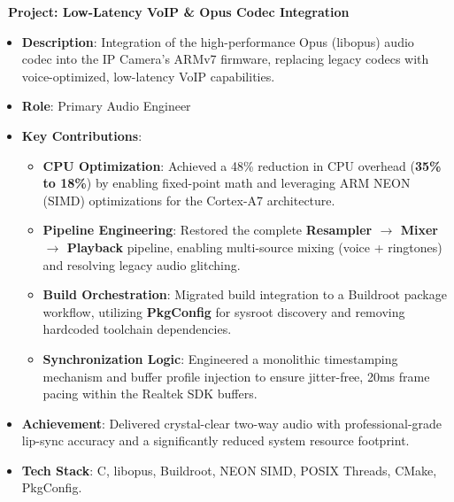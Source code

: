 \documentclass[letterpaper,10pt]{article}
\newenvironment{resume_list}{
  \vspace{-7pt}
  \begin{itemize}[itemsep=-2px, parsep=1pt, leftmargin=30pt]
}{
  \end{itemize}
}
\begin{document}
\begin{resume_list}
      \item \textbf{\faMicrophone\ Project: Low-Latency VoIP \& Opus Codec Integration}
        \begin{itemize}[itemsep=1pt, leftmargin=15pt, label=-]
          \item \textbf{Description}: Integration of the high-performance Opus (libopus) audio codec into the IP Camera’s ARMv7 firmware, replacing legacy codecs with voice-optimized, low-latency VoIP capabilities.
          \item \textbf{Role}: Primary Audio Engineer
          \item \textbf{Key Contributions}:
            \begin{itemize}[itemsep=0pt, leftmargin=10pt, label=$\circ$]
               \item \textbf{CPU Optimization}: Achieved a 48\% reduction in CPU overhead (\textbf{35\% to 18\%}) by enabling fixed-point math and leveraging ARM NEON (SIMD) optimizations for the Cortex-A7 architecture.
               \item \textbf{Pipeline Engineering}: Restored the complete \textbf{Resampler $\rightarrow$ Mixer $\rightarrow$ Playback} pipeline, enabling multi-source mixing (voice + ringtones) and resolving legacy audio glitching.
               \item \textbf{Build Orchestration}: Migrated build integration to a Buildroot package workflow, utilizing \textbf{PkgConfig} for sysroot discovery and removing hardcoded toolchain dependencies.
               \item \textbf{Synchronization Logic}: Engineered a monolithic timestamping mechanism and buffer profile injection to ensure jitter-free, 20ms frame pacing within the Realtek SDK buffers.
            \end{itemize}
          \item \textbf{Achievement}: Delivered crystal-clear two-way audio with professional-grade lip-sync accuracy and a significantly reduced system resource footprint.
          \item \textbf{Tech Stack}: C, libopus, Buildroot, NEON SIMD, POSIX Threads, CMake, PkgConfig.
        \end{itemize}


\end{resume_list}
\end{document}
